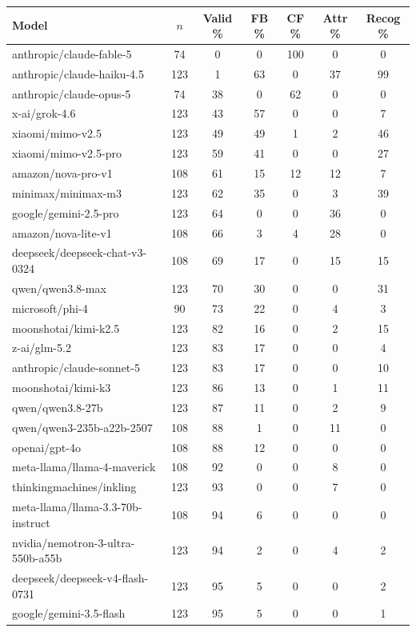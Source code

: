 \begin{tabular}{lcccccc}
\toprule
Model & $n$ & Valid \% & FB \% & CF \% & Attr \% & Recog \% \\
\midrule
anthropic/claude-fable-5 & 74 & 0 & 0 & 100 & 0 & 0 \\
anthropic/claude-haiku-4.5 & 123 & 1 & 63 & 0 & 37 & 99 \\
anthropic/claude-opus-5 & 74 & 38 & 0 & 62 & 0 & 0 \\
x-ai/grok-4.6 & 123 & 43 & 57 & 0 & 0 & 7 \\
xiaomi/mimo-v2.5 & 123 & 49 & 49 & 1 & 2 & 46 \\
xiaomi/mimo-v2.5-pro & 123 & 59 & 41 & 0 & 0 & 27 \\
amazon/nova-pro-v1 & 108 & 61 & 15 & 12 & 12 & 7 \\
minimax/minimax-m3 & 123 & 62 & 35 & 0 & 3 & 39 \\
google/gemini-2.5-pro & 123 & 64 & 0 & 0 & 36 & 0 \\
amazon/nova-lite-v1 & 108 & 66 & 3 & 4 & 28 & 0 \\
deepseek/deepseek-chat-v3-0324 & 108 & 69 & 17 & 0 & 15 & 15 \\
qwen/qwen3.8-max & 123 & 70 & 30 & 0 & 0 & 31 \\
microsoft/phi-4 & 90 & 73 & 22 & 0 & 4 & 3 \\
moonshotai/kimi-k2.5 & 123 & 82 & 16 & 0 & 2 & 15 \\
z-ai/glm-5.2 & 123 & 83 & 17 & 0 & 0 & 4 \\
anthropic/claude-sonnet-5 & 123 & 83 & 17 & 0 & 0 & 10 \\
moonshotai/kimi-k3 & 123 & 86 & 13 & 0 & 1 & 11 \\
qwen/qwen3.8-27b & 123 & 87 & 11 & 0 & 2 & 9 \\
qwen/qwen3-235b-a22b-2507 & 108 & 88 & 1 & 0 & 11 & 0 \\
openai/gpt-4o & 108 & 88 & 12 & 0 & 0 & 0 \\
meta-llama/llama-4-maverick & 108 & 92 & 0 & 0 & 8 & 0 \\
thinkingmachines/inkling & 123 & 93 & 0 & 0 & 7 & 0 \\
meta-llama/llama-3.3-70b-instruct & 108 & 94 & 6 & 0 & 0 & 0 \\
nvidia/nemotron-3-ultra-550b-a55b & 123 & 94 & 2 & 0 & 4 & 2 \\
deepseek/deepseek-v4-flash-0731 & 123 & 95 & 5 & 0 & 0 & 2 \\
google/gemini-3.5-flash & 123 & 95 & 5 & 0 & 0 & 1 \\

\end{tabular}
